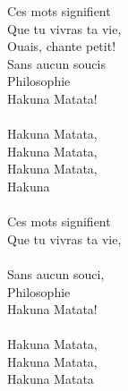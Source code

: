 Ces mots signifient\\
Que tu vivras ta vie,\\
Ouais, chante petit!\\
Sans aucun soucis\\
Philosophie\\
Hakuna Matata!\\
\\
Hakuna Matata,\\
Hakuna Matata,\\
Hakuna Matata,\\
Hakuna\\
\\
Ces mots signifient\\
Que tu vivras ta vie,\\
\\
Sans aucun souci,\\
Philosophie\\
Hakuna Matata!\\
\\
Hakuna Matata,\\
Hakuna Matata,\\
Hakuna Matata